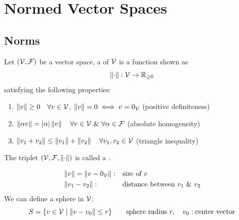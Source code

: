 \section{Normed Vector Spaces}\label{sec:normed}

\subsection{Norms}\label{ss:norms}

\begin{definition}
Let $(\mathcal{V},\mathcal{F})$ be a vector space, a  of $\mathcal{V}$ is a function shown as
\[ \left\lVert \cdot \right\rVert: \mathcal{V}\to\mathbb{R}_{\ge0} \]
satisfying the following properties:
\begin{enumerate}[label=(N\arabic*),leftmargin=3.2em]
\item $\left\lVert v \right\rVert\ge0 \quad \forall v\in\mathcal{V}$, \quad $\left\lVert v \right\rVert=0 \iff v=0_{\mathcal{V}}$ \hfill (positive definiteness)
\item $\left\lVert \alpha v \right\rVert = \left\lvert \alpha \right\rvert\left\lVert v \right\rVert \quad \forall v\in\mathcal{V}\ \&\ \forall\alpha\in\mathcal{F}$ \hfill (absolute homogeneity)
\item $\left\lVert v_1+v_2 \right\rVert\le\left\lVert v_1 \right\rVert+\left\lVert v_2 \right\rVert \quad \forall v_1,v_2\in\mathcal{V}$ \hfill (triangle inequality)
\end{enumerate}
The triplet $(\mathcal{V},\mathcal{F},\left\lVert \cdot \right\rVert)$ is called a .
\end{definition}
\begin{align*}
&\norm{v} = \norm{v-0_{\V}}: && \text{size of } v\\
&\norm{v_1-v_2}: && \text{distance between } v_1 \ \&\ v_2
\end{align*}
We can define a sphere in $\mathcal{V}$:
\[
S = \{ v\in\mathcal{V} \mid \left\lVert v-v_0 \right\rVert\le r\} \qquad \text{sphere radius } r,\quad v_0: \text{center vector}
\]

